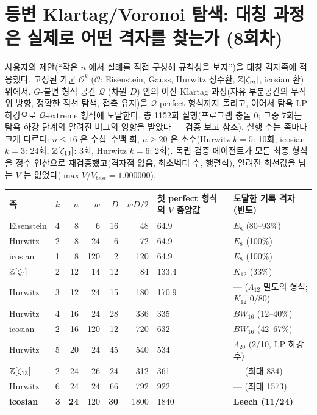 \section{등변 Klartag/Voronoi 탐색: 대칭 과정은 실제로 어떤 격자를 찾는가 (8회차)}\label{sec:equiv}

사용자의 제안(``작은 $n$ 에서 실례를 직접 구성해 규칙성을 보자'')을 대칭 격자족에 적용했다. 고정된 가군 $\mathcal O^k$ ($\mathcal O$: Eisenstein, Gauss, Hurwitz 정수환, $\mathbb{Z}[\zeta_m]$, icosian 환) 위에서, $G$-불변 형식 공간 $\mathcal Q$ (차원 $D$) 안의 이산 Klartag 과정(자유 부분공간의 무작위 방향, 정확한 직선 탐색, 접촉 유지)을 $\mathcal Q$-perfect 형식까지 돌리고, 이어서 탐욕 LP 하강으로 $\mathcal Q$-extreme 형식에 도달한다. 총 1152회 실행(프로그램 충돌 0; 그중 7회는 탐욕 하강 단계의 알려진 버그의 영향을 받았다 --- 검증 보고 참조). 실행 수는 족마다 크게 다르다: $n\le16$ 은 수십~수백 회, $n\ge20$ 은 소수(Hurwitz $k=5$: 10회, icosian $k=3$: 24회, $\mathbb{Z}[\zeta_{13}]$: 3회, Hurwitz $k=6$: 2회). 독립 검증 에이전트가 모든 최종 형식을 정수 연산으로 재검증했고(격자점 없음, 최소벡터 수, 행렬식), 알려진 최선값을 넘는 $V$ 는 없었다($\max V/V_{best}=1.000000$).

\begin{center}
\small
\begin{tabular}{@{}llrrrrll@{}}
\toprule
족 & $k$ & $n$ & $w$ & $D$ & $wD/2$ & 첫 perfect 형식의 $V$ 중앙값 & 도달한 기록 격자 (빈도)\\
\midrule
Eisenstein & 4 & 8 & 6 & 16 & 48 & 64.9 & $E_8$ (80--93\%)\\
Hurwitz & 2 & 8 & 24 & 6 & 72 & 64.9 & $E_8$ (100\%)\\
icosian & 1 & 8 & 120 & 2 & 120 & 64.9 & $E_8$ (100\%)\\
$\mathbb{Z}[\zeta_7]$ & 2 & 12 & 14 & 12 & 84 & 133.4 & $K_{12}$ (33\%)\\
Hurwitz & 3 & 12 & 24 & 15 & 180 & 170.9 & --- ($\Lambda_{12}$ 밀도의 형식; $K_{12}$ 0/80)\\
Hurwitz & 4 & 16 & 24 & 28 & 336 & 335 & $BW_{16}$ (12--40\%)\\
icosian & 2 & 16 & 120 & 12 & 720 & 632 & $BW_{16}$ (42--67\%)\\
Hurwitz & 5 & 20 & 24 & 45 & 540 & 534 & $\Lambda_{20}$ (2/10, LP 하강 후)\\
$\mathbb{Z}[\zeta_{13}]$ & 2 & 24 & 26 & 24 & 312 & 361 & --- (최대 834)\\
Hurwitz & 6 & 24 & 24 & 66 & 792 & 922 & --- (최대 1573)\\
\textbf{icosian} & \textbf{3} & \textbf{24} & 120 & \textbf{30} & 1800 & 1840 & \textbf{Leech (11/24)}\\
\bottomrule
\end{tabular}
\end{center}

